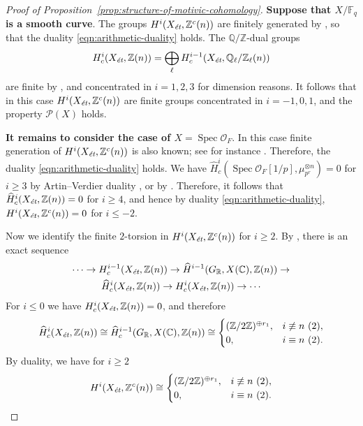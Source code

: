 \documentclass[draft]{article}
\DeclareMathOperator{\Spec}{Spec}
\newcommand{\CC}{\mathbb{C}}
\newcommand{\FF}{\mathbb{F}}
\newcommand{\QQ}{\mathbb{Q}}
\newcommand{\RR}{\mathbb{R}}
\newcommand{\ZZ}{\mathbb{Z}}
\newcommand{\et}{\text{\it \'{e}t}}
\theoremstyle{myplain}
\theoremstyle{mydefinition}
\numberwithin{equation}{section}
\begin{document}
\begin{proof}[Proof of Proposition~\ref{prop:structure-of-motivic-cohomology}]
  \vspace{1em}

  \textbf{Suppose that $X/\FF_q$ is a smooth curve}. The groups
  $H^i (X_\et, \ZZ^c (n))$ are finitely generated by
  \cite[Proposition~4.3]{Geisser-2017}, so that the duality
  \eqref{eqn:arithmetic-duality} holds. The $\QQ/\ZZ$-dual groups
  \[ H^i_c (X_\et, \ZZ(n)) =
    \bigoplus_\ell H^{i-1}_c (X_\et, \QQ_\ell/\ZZ_\ell (n)) \]
  are finite by \cite[Theorem~3]{Kahn-2003}, and concentrated in
  $i = 1,2,3$ for dimension reasons. It follows that in this case
  $H^i (X_\et, \ZZ^c (n))$ are finite groups concentrated in $i = -1,0,1$,
  and the property $\mathcal{P} (X)$ holds.

  \vspace{1em}

  \textbf{It remains to consider the case of $X = \Spec \mathcal{O}_F$}.
  In this case finite generation of $H^i (X_\et, \ZZ^c (n))$ is also known; see
  for instance \cite[Proposition~4.14]{Geisser-2017}. Therefore, the duality
  \eqref{eqn:arithmetic-duality} holds. We have
  $\widehat{H}^i_c (\Spec \mathcal{O}_F [1/p], \mu_{p^r}^{\otimes n}) = 0$ for
  $i \ge 3$ by Artin--Verdier duality
  \cite[Chapter~II, Corollary~3.3]{Milne-ADT}, or by
  \cite[p.\,268]{Soule-1979}. Therefore, it follows that
  $\widehat{H}^i_c (X_\et, \ZZ (n)) = 0$ for $i \ge 4$, and hence by duality
  \eqref{eqn:arithmetic-duality}, $H^i (X_\et, \ZZ^c (n)) = 0$ for $i \le -2$.

  Now we identify the finite $2$-torsion in $H^i (X_\et, \ZZ^c (n))$ for
  $i \ge 2$. By \cite[Lemma~6.14]{Flach-Morin-2018}, there is an exact
  sequence
  \begin{multline}
    \label{eqn:les-Hc-vs-H-hat-c}
    \cdots \to H^{i-1}_c (X_\et, \ZZ (n)) \to
    \widehat{H}^{i-1} (G_\RR, X(\CC), \ZZ (n)) \to \\
    \widehat{H}^i_c (X_\et, \ZZ (n)) \to
    H^i_c (X_\et, \ZZ (n)) \to \cdots
  \end{multline}
  For $i \le 0$ we have $H^i_c (X_\et, \ZZ (n)) = 0$, and therefore
  \[ \widehat{H}^i_c (X_\et, \ZZ (n)) \cong
    \widehat{H}^{i-1}_c (G_\RR, X(\CC), \ZZ (n)) \cong
    \begin{cases}
      (\ZZ/2\ZZ)^{\oplus r_1}, & i\not\equiv n ~ (2), \\
      0, & i\equiv n ~ (2).
    \end{cases} \]
  By duality, we have for $i \ge 2$
  \[ H^i (X_\et, \ZZ^c (n)) \cong
    \begin{cases}
      (\ZZ/2\ZZ)^{\oplus r_1}, & i\not\equiv n ~ (2), \\
      0, & i\equiv n ~ (2).
    \end{cases} \]


\end{proof}
\end{document}
